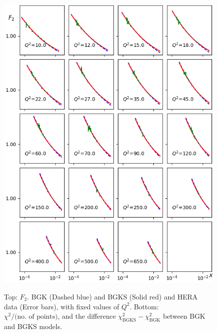 \documentclass[11pt]{article}
\begin{document}
\begin{figure}[p]
{\includegraphics{./Plots/F2-data-BGK2.png}
}
\caption{
Top: $F_2$. BGK (Dashed blue) and BGKS (Solid red) and HERA data (Error bars), with fixed values of $Q^2$. Bottom: $\chi^2/\text{(no. of points)}$, and the difference $\chi^2_{\mathrm{BGKS}}-\chi^2_{\mathrm{BGK}}$ between BGK and BGKS models.}
\label{fig:gridBGK}
\end{figure}
\end{document}
